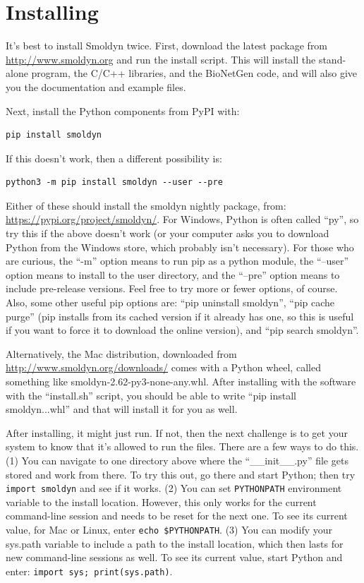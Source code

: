 \documentclass {book}
\newcommand {\ttt} {\texttt}
\begin{document}
\section{Installing}

It's best to install Smoldyn twice. First, download the latest package from \url{http://www.smoldyn.org} and run the install script. This will install the stand-alone program, the C/C++ libraries, and the BioNetGen code, and will also give you the documentation and example files.

Next, install the Python components from PyPI with:
\begin{lstlisting}[style=SSAC]
pip install smoldyn
\end{lstlisting}
If this doesn't work, then a different possibility is:
\begin{lstlisting}[style=SSAC]
python3 -m pip install smoldyn --user --pre
\end{lstlisting}
Either of these should install the smoldyn nightly package, from: \url{https://pypi.org/project/smoldyn/}. For Windows, Python is often called ``py'', so try this if the above doesn't work (or your computer asks you to download Python from the Windows store, which probably isn't necessary). For those who are curious, the ``-m'' option means to run pip as a python module, the ``--user'' option means to install to the user directory, and the ``--pre'' option means to include pre-release versions. Feel free to try more or fewer options, of course. Also, some other useful pip options are: ``pip uninstall smoldyn'', ``pip cache purge'' (pip installs from its cached version if it already has one, so this is useful if you want to force it to download the online version), and ``pip search smoldyn''.

Alternatively, the Mac distribution, downloaded from \url{http://www.smoldyn.org/downloads/} comes with a Python wheel, called something like smoldyn-2.62-py3-none-any.whl. After installing with the software with the ``install.sh'' script, you should be able to write ``pip install smoldyn...whl'' and that will install it for you as well.

After installing, it might just run. If not, then the next challenge is to get your system to know that it's allowed to run the files. There are a few ways to do this. (1) You can navigate to one directory above where the ``\_\_init\_\_.py'' file gets stored and work from there. To try this out, go there and start Python; then try \ttt{import smoldyn} and see if it works. (2) You can set \ttt{PYTHONPATH} environment variable to the install location. However, this only works for the current command-line session and needs to be reset for the next one. To see its current value, for Mac or Linux, enter \ttt{echo \$PYTHONPATH}. (3) You can modify your sys.path variable to include a path to the install location, which then lasts for new command-line sessions as well. To see its current value, start Python and enter: \ttt{import sys; print(sys.path)}.
\end{document}
